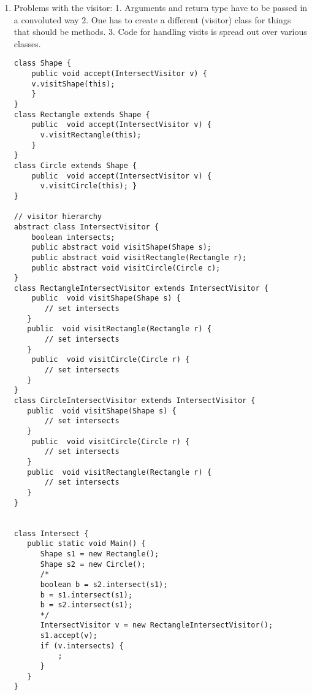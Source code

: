 \documentclass{article}
\begin{document}
\begin{enumerate}
\begin{verbatim}
}
\end{verbatim}
\item Problems with the visitor: 
1. Arguments and return type have to be passed in a convoluted way
2. One has to create a different (visitor) class for things that should be methods.
3. Code for handling visits is spread out over various classes.

\begin{verbatim}
class Shape {
    public void accept(IntersectVisitor v) {
	v.visitShape(this);
    }
}
class Rectangle extends Shape {
    public  void accept(IntersectVisitor v) { 
      v.visitRectangle(this);
    }
}
class Circle extends Shape {
    public  void accept(IntersectVisitor v) { 
      v.visitCircle(this); } 
}
 
// visitor hierarchy
abstract class IntersectVisitor { 
    boolean intersects; 
    public abstract void visitShape(Shape s);
    public abstract void visitRectangle(Rectangle r); 
    public abstract void visitCircle(Circle c); 
} 
class RectangleIntersectVisitor extends IntersectVisitor {
    public  void visitShape(Shape s) {
       // set intersects
   }
   public  void visitRectangle(Rectangle r) {
       // set intersects
   }
    public  void visitCircle(Circle r) {
       // set intersects
   }
}
class CircleIntersectVisitor extends IntersectVisitor { 
   public  void visitShape(Shape s) {
       // set intersects
   }
    public  void visitCircle(Circle r) {
       // set intersects
   }
   public  void visitRectangle(Rectangle r) {
       // set intersects
   }
}


class Intersect {
   public static void Main() {
      Shape s1 = new Rectangle(); 
      Shape s2 = new Circle();
      /* 
      boolean b = s2.intersect(s1);
      b = s1.intersect(s1);
      b = s2.intersect(s1);
      */
      IntersectVisitor v = new RectangleIntersectVisitor();
      s1.accept(v);
      if (v.intersects) {
          ; 
      }
   }
}
\end{verbatim}

\end{enumerate}
\end{document}
